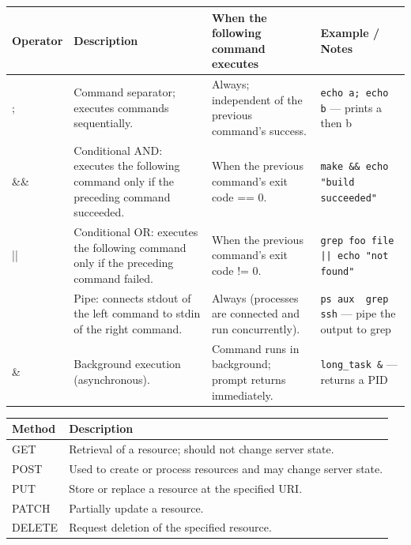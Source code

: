 \documentclass{article}
\begin{document}
\begin{description}
\begin{center}
        \begin{tabular}{p{1.6cm} p{6cm} p{5cm} p{3.2cm}}
          \hline
            Operator & \textbf{Description} & \textbf{When the following command executes} & \textbf{Example / Notes} \\
          \hline
          	; & Command separator; executes commands sequentially. & Always; independent of the previous command's success. & \texttt{echo a; echo b} — prints a then b \\
          	\&\& & Conditional AND: executes the following command only if the preceding command succeeded. & When the previous command's exit code == 0. & \texttt{make \&\& echo "build succeeded"} \\
          	|| & Conditional OR: executes the following command only if the preceding command failed. & When the previous command's exit code != 0. & \texttt{grep foo file || echo "not found"} \\
          	\textbar & Pipe: connects stdout of the left command to stdin of the right command. & Always (processes are connected and run concurrently). & \texttt{ps aux \textbar\ grep ssh} — pipe the output to grep \\
          	\& & Background execution (asynchronous). & Command runs in background; prompt returns immediately. & \texttt{long\_task \&} — returns a PID \\
          \hline
        \end{tabular}
      \end{center}

     \begin{center}

      \label{tab:http-methods}
      \vspace{0.5em}

      \begin{tabular}{p{2.2cm} p{7.0cm}}
        \hline
        	\textbf{Method} & \textbf{Description} \\
        \hline
        	GET & Retrieval of a resource; should not change server state. \\
        	POST & Used to create or process resources and may change server state. \\
        	PUT & Store or replace a resource at the specified URI. \\
        	PATCH & Partially update a resource. \\
        	DELETE & Request deletion of the specified resource. \\
        \hline
      \end{tabular}
    \end{center}


\end{description}
\end{document}
